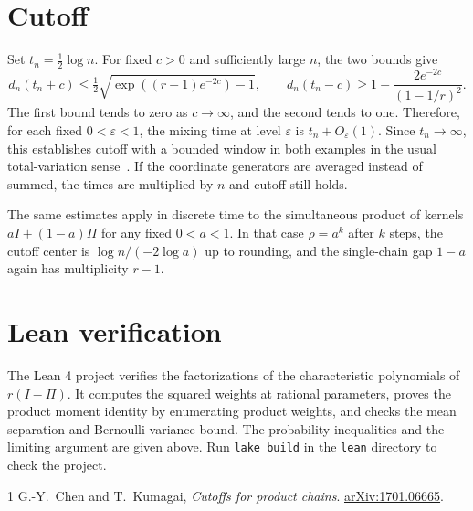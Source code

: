 \documentclass[11pt]{article}
\begin{document}
\section*{Cutoff}

Set $t_n=\tfrac12\log n$. For fixed $c>0$ and sufficiently large $n$, the
two bounds give
\[
 d_n(t_n+c)\le \tfrac12\sqrt{\exp((r-1)e^{-2c})-1},
 \qquad
 d_n(t_n-c)\ge 1-\frac{2e^{-2c}}{(1-1/r)^2}.
\]
The first bound tends to zero as $c\to\infty$, and the second tends to
one. Therefore, for each fixed $0<\varepsilon<1$, the mixing time
at level $\varepsilon$ is $t_n+O_\varepsilon(1)$. Since $t_n\to\infty$,
this establishes cutoff with a bounded window in both examples
in the usual total-variation sense~\cite[Definition~2.1]{ck}. If the
coordinate generators are averaged instead of summed, the times are
multiplied by $n$ and cutoff still holds.

The same estimates apply in discrete time to the simultaneous product
of kernels $aI+(1-a)\Pi$ for any fixed $0<a<1$. In that case $\rho=a^k$
after $k$ steps, the cutoff center is $\log n/(-2\log a)$ up to rounding,
and the single-chain gap $1-a$ again has multiplicity $r-1$.

\section*{Lean verification}

The Lean 4 project verifies the factorizations of the characteristic
polynomials of $r(I-\Pi)$. It computes the squared weights at rational
parameters, proves the product moment identity by enumerating product
weights, and checks the mean separation and Bernoulli variance bound.
The probability inequalities and the limiting argument are given above.
Run \texttt{lake build} in the \texttt{lean} directory to check the
project.

\begin{thebibliography}{1}
G.-Y.~Chen and T.~Kumagai, \emph{Cutoffs for product chains}.
\href{https://arxiv.org/abs/1701.06665}{arXiv:1701.06665}.
\end{thebibliography}
\end{document}
